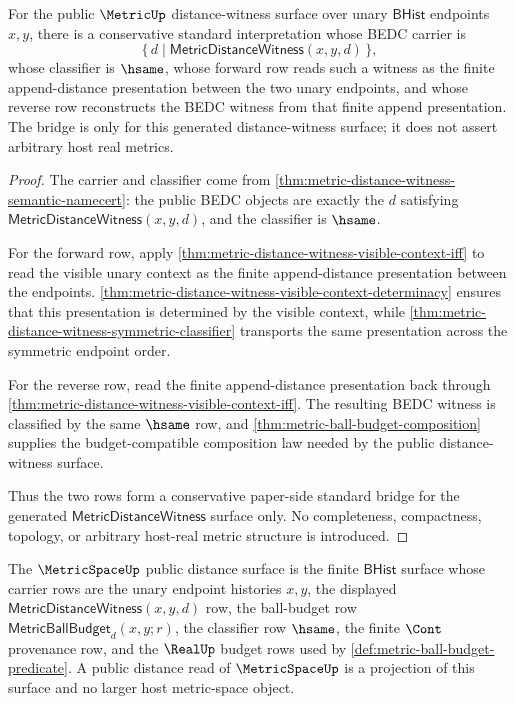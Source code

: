 \begin{theorem}
\label{thm:metric-distance-witness-standard-bridge}
For the public $\MetricUp$ distance-witness surface over unary
$\mathsf{BHist}$ endpoints $x,y$, there is a conservative standard
interpretation whose BEDC carrier is
$$
\{\,d\mid \mathsf{MetricDistanceWitness}(x,y,d)\,\},
$$
whose classifier is $\hsame$, whose forward row reads such a witness as the
finite append-distance presentation between the two unary endpoints, and whose
reverse row reconstructs the BEDC witness from that finite append presentation.
The bridge is only for this generated distance-witness surface; it does not
assert arbitrary host real metrics.
\end{theorem}
\begin{proof}
The carrier and classifier come from
\autoref{thm:metric-distance-witness-semantic-namecert}: the public BEDC
objects are exactly the $d$ satisfying
$\mathsf{MetricDistanceWitness}(x,y,d)$, and the classifier is $\hsame$.

For the forward row, apply
\autoref{thm:metric-distance-witness-visible-context-iff} to read the visible
unary context as the finite append-distance presentation between the endpoints.
\autoref{thm:metric-distance-witness-visible-context-determinacy} ensures that
this presentation is determined by the visible context, while
\autoref{thm:metric-distance-witness-symmetric-classifier} transports the same
presentation across the symmetric endpoint order.

For the reverse row, read the finite append-distance presentation back through
\autoref{thm:metric-distance-witness-visible-context-iff}. The resulting BEDC
witness is classified by the same $\hsame$ row, and
\autoref{thm:metric-ball-budget-composition} supplies the budget-compatible
composition law needed by the public distance-witness surface.

Thus the two rows form a conservative paper-side standard bridge for the
generated $\mathsf{MetricDistanceWitness}$ surface only. No completeness,
compactness, topology, or arbitrary host-real metric structure is introduced.
\end{proof}

\begin{definition}
\label{def:metricspace-public-distance-surface}
The $\MetricSpaceUp$ public distance surface is the finite $\mathsf{BHist}$
surface whose carrier rows are the unary endpoint histories $x,y$, the
displayed $\mathsf{MetricDistanceWitness}(x,y,d)$ row, the ball-budget row
$\mathsf{MetricBallBudget}_d(x,y;r)$, the classifier row $\hsame$, the finite
$\Cont$ provenance row, and the $\RealUp$ budget rows used by
\autoref{def:metric-ball-budget-predicate}. A public distance read of
$\MetricSpaceUp$ is a projection of this surface and no larger host metric-space
object.
\end{definition}


